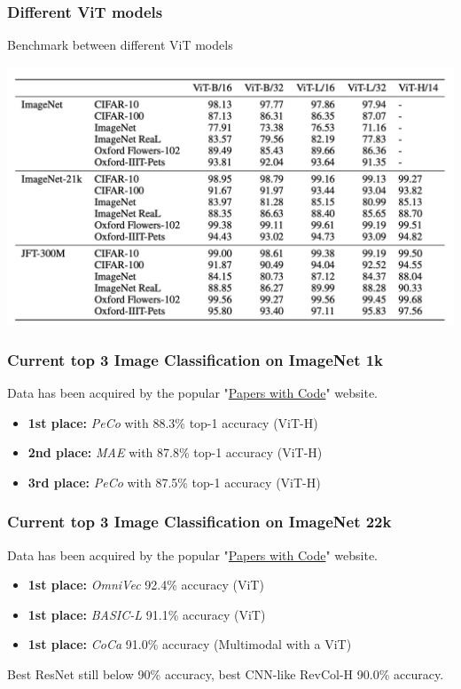 \begin{frame}
\frametitle{Different ViT models}
Benchmark between different ViT models
\begin{center}
    \includegraphics[width=1\textwidth]{img/4-section/More-benchmark_2.png}
\end{center}

\end{frame}


\begin{frame}
\frametitle{Current top 3 Image Classification on ImageNet 1k}
Data has been acquired by the popular "\href{https://paperswithcode.com/sota/image-classification-on-imagenet?tag_filter=171}{Papers with Code}" website.


\begin{itemize}
    \item \textbf{1st place:} \textit{PeCo} with 88.3\% top-1 accuracy (ViT-H)
    \item \textbf{2nd place:} \textit{MAE} with 87.8\% top-1 accuracy (ViT-H)
    \item \textbf{3rd place:} \textit{PeCo} with 87.5\% top-1 accuracy (ViT-H)
\end{itemize}

\end{frame}

\begin{frame}
\frametitle{Current top 3 Image Classification on ImageNet 22k}
Data has been acquired by the popular "\href{https://paperswithcode.com/sota/image-classification-on-imagenet}{Papers with Code}" website.


\begin{itemize}
    \item \textbf{1st place:} \textit{OmniVec} 92.4\% accuracy (ViT)
    \item \textbf{1st place:} \textit{BASIC-L} 91.1\% accuracy (ViT)
    \item \textbf{1st place:} \textit{CoCa} 91.0\% accuracy (Multimodal with a ViT)
\end{itemize}

Best ResNet still below 90\% accuracy, best CNN-like RevCol-H 90.0\% accuracy.

\end{frame}